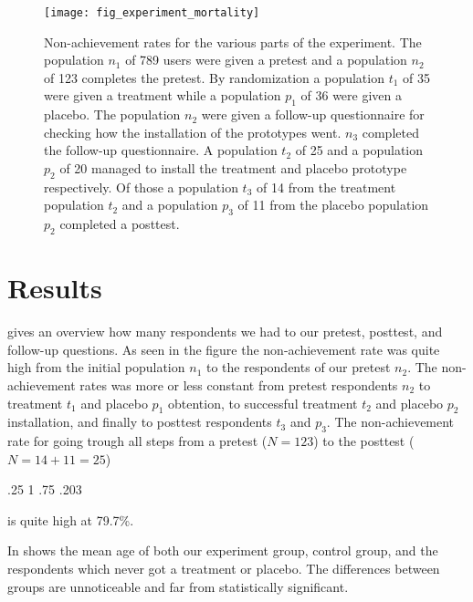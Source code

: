 \begin{figure}
  \begin{whole}
  \texttt{[image: fig\_experiment\_mortality]}
  \caption[Experiment Non-Achievement Rates]{
    Non-achievement rates for the various parts of the experiment.
    The population $n_1$ of 789 \urort{} users were given a pretest and
    a population $n_2$ of 123 completes the pretest.
    By randomization a population $t_1$ of 35 were given a treatment while
    a population $p_1$ of 36 were given a placebo.
    The population $n_2$ were given a follow-up questionnaire for checking
    how the installation of the prototypes went. $n_3$ completed the follow-up
    questionnaire.
    A population $t_2$ of 25 and a population $p_2$ of 20 managed to install
    the treatment and placebo prototype respectively.
    Of those a population $t_3$ of 14 from the treatment population $t_2$ and
    a population $p_3$ of 11 from the placebo population $p_2$ completed
    a posttest.
  }
  \label{figure:fig.experiment.mortality}
  \end{whole}
\end{figure}

\section{Results}

 gives an overview how many respondents we
had to our pretest, posttest, and follow-up questions. As seen in the figure
the non-achievement rate was quite high from the initial population $n_1$ to
the respondents of our pretest $n_2$. The non-achievement
rates was more or less constant from pretest respondents $n_2$ to treatment
$t_1$ and placebo $p_1$ obtention, to successful treatment $t_2$ and placebo
$p_2$ installation, and finally to posttest respondents $t_3$ and $p_3$.
The non-achievement rate for going trough
all steps from a pretest ($N = 123$) to the posttest ($N = 14 + 11 = 25$)
\begin{sparkline}{3}
  \sparkspike .25  1
  \sparkspike .75  .203
\end{sparkline}
is quite high at 79.7\%.

In  shows the mean age of both our experiment
group, control group, and the respondents which never got a treatment or
placebo. The differences between groups are unnoticeable and far from
statistically significant.


